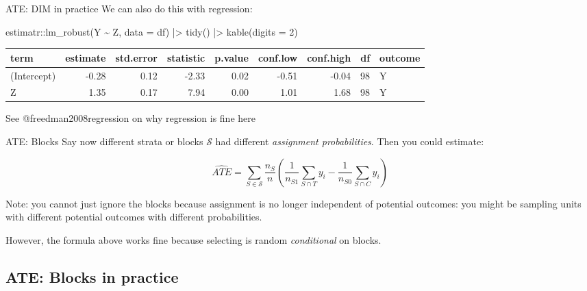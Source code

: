 \documentclass[
  11pt,
  ignorenonframetext,
]{beamer}
\newenvironment{Shaded}{\begin{snugshade}}{\end{snugshade}}
\newcommand{\AttributeTok}[1]{\textcolor[rgb]{0.40,0.45,0.13}{#1}}
\newcommand{\DecValTok}[1]{\textcolor[rgb]{0.68,0.00,0.00}{#1}}
\newcommand{\FunctionTok}[1]{\textcolor[rgb]{0.28,0.35,0.67}{#1}}
\newcommand{\NormalTok}[1]{\textcolor[rgb]{0.00,0.23,0.31}{#1}}
\newcommand{\SpecialCharTok}[1]{\textcolor[rgb]{0.37,0.37,0.37}{#1}}
\begin{document}
\begin{frame}[fragile]{ATE: DIM in practice}
\protect\hypertarget{ate-dim-in-practice-1}{}
We can also do this with regression:

\begin{Shaded}
\begin{Highlighting}[]
\NormalTok{estimatr}\SpecialCharTok{::}\FunctionTok{lm\_robust}\NormalTok{(Y }\SpecialCharTok{\textasciitilde{}}\NormalTok{ Z, }\AttributeTok{data =}\NormalTok{ df) }\SpecialCharTok{|\textgreater{}}
  \FunctionTok{tidy}\NormalTok{() }\SpecialCharTok{|\textgreater{}} \FunctionTok{kable}\NormalTok{(}\AttributeTok{digits =} \DecValTok{2}\NormalTok{)}
\end{Highlighting}
\end{Shaded}

\begin{tabular}{l|r|r|r|r|r|r|r|l}
\hline
term & estimate & std.error & statistic & p.value & conf.low & conf.high & df & outcome\\
\hline
(Intercept) & -0.28 & 0.12 & -2.33 & 0.02 & -0.51 & -0.04 & 98 & Y\\
\hline
Z & 1.35 & 0.17 & 7.94 & 0.00 & 1.01 & 1.68 & 98 & Y\\
\hline
\end{tabular}

See @freedman2008regression on why regression is fine here
\end{frame}

\begin{frame}{ATE: Blocks}
\protect\hypertarget{ate-blocks}{}
Say now different strata or blocks \(\mathcal{S}\) had different
\emph{assignment probabilities}. Then you could estimate:

\begin{equation} \widehat{ATE} = \sum_{S\in \mathcal{S}}\frac{n_{S}}{n} \left(\frac{1}{n_{S1}}\sum_{S\cap T}y_i - \frac{1}{n_{S0}}\sum_{S\cap C}y_i \right) \end{equation}

Note: you cannot just ignore the blocks because assignment is no longer
independent of potential outcomes: you might be sampling units with
different potential outcomes with different probabilities.

However, the formula above works fine because selecting is random
\emph{conditional} on blocks.
\end{frame}

\hypertarget{ate-blocks-in-practice}{%
\subsection{ATE: Blocks in practice}\label{ate-blocks-in-practice}}
\end{document}
